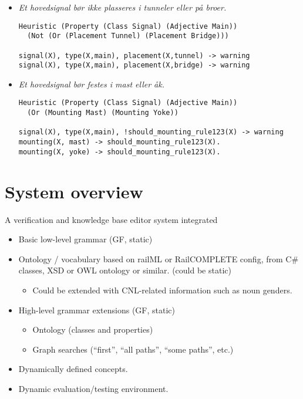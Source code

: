 \documentclass[]{article}
\providecommand{\tightlist}{%
  \setlength{\itemsep}{0pt}\setlength{\parskip}{0pt}}
\begin{document}
\begin{itemize}
\item
  \emph{Et hovedsignal bør ikke plasseres i tunneler eller på broer.}

\begin{verbatim}
Heuristic (Property (Class Signal) (Adjective Main)) 
  (Not (Or (Placement Tunnel) (Placement Bridge)))

signal(X), type(X,main), placement(X,tunnel) -> warning
signal(X), type(X,main), placement(X,bridge) -> warning
\end{verbatim}
\item
  \emph{Et hovedsignal bør festes i mast eller åk.}

\begin{verbatim}
Heuristic (Property (Class Signal) (Adjective Main)) 
  (Or (Mounting Mast) (Mounting Yoke))

signal(X), type(X,main), !should_mounting_rule123(X) -> warning
mounting(X, mast) -> should_mounting_rule123(X).
mounting(X, yoke) -> should_mounting_rule123(X).
\end{verbatim}
\end{itemize}

\section{System overview}\label{system-overview}

A verification and knowledge base editor system integrated

\begin{itemize}
\tightlist
\item
  Basic low-level grammar (GF, static)
\item
  Ontology / vocabulary based on railML or RailCOMPLETE config, from C\#
  classes, XSD or OWL ontology or similar. (could be static)

  \begin{itemize}
  \tightlist
  \item
    Could be extended with CNL-related information such as noun genders.
  \end{itemize}
\item
  High-level grammar extensions (GF, static)

  \begin{itemize}
  \tightlist
  \item
    Ontology (classes and properties)
  \item
    Graph searches (``first'', ``all paths'', ``some paths'', etc.)
  \end{itemize}
\item
  Dynamically defined concepts.
\item
  Dynamic evaluation/testing environment.
\end{itemize}
\end{document}
